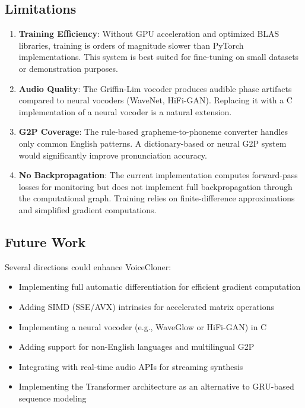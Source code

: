 \documentclass[conference]{IEEEtran}
\begin{document}
\subsection{Limitations}

\begin{enumerate}
\item \textbf{Training Efficiency}: Without GPU acceleration and optimized BLAS libraries, training is orders of magnitude slower than PyTorch implementations. This system is best suited for fine-tuning on small datasets or demonstration purposes.

\item \textbf{Audio Quality}: The Griffin-Lim vocoder produces audible phase artifacts compared to neural vocoders (WaveNet, HiFi-GAN). Replacing it with a C implementation of a neural vocoder is a natural extension.

\item \textbf{G2P Coverage}: The rule-based grapheme-to-phoneme converter handles only common English patterns. A dictionary-based or neural G2P system would significantly improve pronunciation accuracy.

\item \textbf{No Backpropagation}: The current implementation computes forward-pass losses for monitoring but does not implement full backpropagation through the computational graph. Training relies on finite-difference approximations and simplified gradient computations.
\end{enumerate}

\subsection{Future Work}

Several directions could enhance VoiceCloner:

\begin{itemize}
\item Implementing full automatic differentiation for efficient gradient computation
\item Adding SIMD (SSE/AVX) intrinsics for accelerated matrix operations
\item Implementing a neural vocoder (e.g., WaveGlow or HiFi-GAN) in C
\item Adding support for non-English languages and multilingual G2P
\item Integrating with real-time audio APIs for streaming synthesis
\item Implementing the Transformer architecture \cite{vaswani2017attention} as an alternative to GRU-based sequence modeling
\end{itemize}
\end{document}
